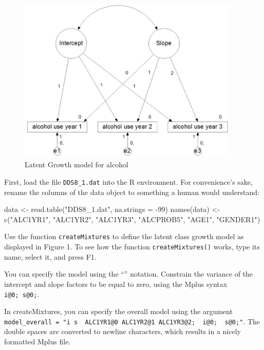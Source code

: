 \documentclass[
]{book}
\newenvironment{Shaded}{\begin{snugshade}}{\end{snugshade}}
\newcommand{\AttributeTok}[1]{\textcolor[rgb]{0.77,0.63,0.00}{#1}}
\newcommand{\DecValTok}[1]{\textcolor[rgb]{0.00,0.00,0.81}{#1}}
\newcommand{\FunctionTok}[1]{\textcolor[rgb]{0.00,0.00,0.00}{#1}}
\newcommand{\NormalTok}[1]{#1}
\newcommand{\OtherTok}[1]{\textcolor[rgb]{0.56,0.35,0.01}{#1}}
\newcommand{\SpecialCharTok}[1]{\textcolor[rgb]{0.00,0.00,0.00}{#1}}
\newcommand{\StringTok}[1]{\textcolor[rgb]{0.31,0.60,0.02}{#1}}
\begin{document}
\begin{figure}
\centering
\includegraphics[width=4.16667in,height=\textheight]{./Materials/Figure1_lgm_alcohol.png}
\caption{Latent Growth model for alcohol}
\end{figure}

First, load the file \texttt{DDS8\_1.dat} into the R environment. For convenience's sake, rename the columns of the data object to something a human would understand:

\begin{Shaded}
\begin{Highlighting}[]
\NormalTok{data }\OtherTok{\textless{}{-}} \FunctionTok{read.table}\NormalTok{(}\StringTok{"DDS8\_1.dat"}\NormalTok{, }\AttributeTok{na.strings =} \SpecialCharTok{{-}}\DecValTok{99}\NormalTok{)}
\FunctionTok{names}\NormalTok{(data) }\OtherTok{\textless{}{-}} \FunctionTok{c}\NormalTok{(}\StringTok{"ALC1YR1"}\NormalTok{, }\StringTok{"ALC1YR2"}\NormalTok{, }\StringTok{"ALC1YR3"}\NormalTok{,}
                 \StringTok{"ALCPROB5"}\NormalTok{, }\StringTok{"AGE1"}\NormalTok{, }\StringTok{"GENDER1"}\NormalTok{)}
\end{Highlighting}
\end{Shaded}

Use the function \texttt{createMixtures} to define the latent class growth model as displayed in Figure 1. To see how the function \texttt{createMixtures()} works, type its name, select it, and press F1.

You can specify the model using the ``\textbar{}'' notation. Constrain the variance of the intercept and slope factors to be equal to zero, using the Mplus syntax \texttt{i@0;\ s@0;}.

In createMixtures, you can specify the overall model using the argument \texttt{model\_overall\ =\ "i\ s\ \textbar{}\ ALC1YR1@0\ ALC1YR2@1\ ALC1YR3@2;\ \ i@0;\ \ s@0;"}. The double spaces are converted to newline characters, which results in a nicely formatted Mplus file.
\end{document}

